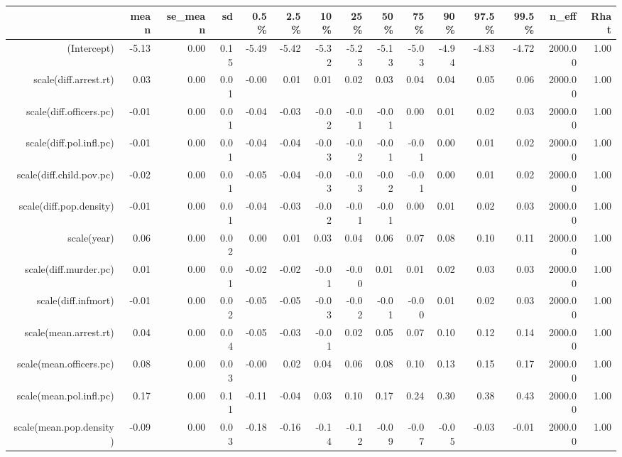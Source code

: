 \begin{table}[ht]
\centering
\begin{tabular}{rrrrrrrrrrrrrrr}
  \hline
 & mean & se\_mean & sd & 0.5\% & 2.5\% & 10\% & 25\% & 50\% & 75\% & 90\% & 97.5\% & 99.5\% & n\_eff & Rhat \\ 
  \hline
(Intercept) & -5.13 & 0.00 & 0.15 & -5.49 & -5.42 & -5.32 & -5.23 & -5.13 & -5.03 & -4.94 & -4.83 & -4.72 & 2000.00 & 1.00 \\ 
  scale(diff.arrest.rt) & 0.03 & 0.00 & 0.01 & -0.00 & 0.01 & 0.01 & 0.02 & 0.03 & 0.04 & 0.04 & 0.05 & 0.06 & 2000.00 & 1.00 \\ 
  scale(diff.officers.pc) & -0.01 & 0.00 & 0.01 & -0.04 & -0.03 & -0.02 & -0.01 & -0.01 & 0.00 & 0.01 & 0.02 & 0.03 & 2000.00 & 1.00 \\ 
  scale(diff.pol.infl.pc) & -0.01 & 0.00 & 0.01 & -0.04 & -0.04 & -0.03 & -0.02 & -0.01 & -0.01 & 0.00 & 0.01 & 0.02 & 2000.00 & 1.00 \\ 
  scale(diff.child.pov.pc) & -0.02 & 0.00 & 0.01 & -0.05 & -0.04 & -0.03 & -0.03 & -0.02 & -0.01 & 0.00 & 0.01 & 0.02 & 2000.00 & 1.00 \\ 
  scale(diff.pop.density) & -0.01 & 0.00 & 0.01 & -0.04 & -0.03 & -0.02 & -0.01 & -0.01 & 0.00 & 0.01 & 0.02 & 0.03 & 2000.00 & 1.00 \\ 
  scale(year) & 0.06 & 0.00 & 0.02 & 0.00 & 0.01 & 0.03 & 0.04 & 0.06 & 0.07 & 0.08 & 0.10 & 0.11 & 2000.00 & 1.00 \\ 
  scale(diff.murder.pc) & 0.01 & 0.00 & 0.01 & -0.02 & -0.02 & -0.01 & -0.00 & 0.01 & 0.01 & 0.02 & 0.03 & 0.03 & 2000.00 & 1.00 \\ 
  scale(diff.infmort) & -0.01 & 0.00 & 0.02 & -0.05 & -0.05 & -0.03 & -0.02 & -0.01 & -0.00 & 0.01 & 0.02 & 0.03 & 2000.00 & 1.00 \\ 
  scale(mean.arrest.rt) & 0.04 & 0.00 & 0.04 & -0.05 & -0.03 & -0.01 & 0.02 & 0.05 & 0.07 & 0.10 & 0.12 & 0.14 & 2000.00 & 1.00 \\ 
  scale(mean.officers.pc) & 0.08 & 0.00 & 0.03 & -0.00 & 0.02 & 0.04 & 0.06 & 0.08 & 0.10 & 0.13 & 0.15 & 0.17 & 2000.00 & 1.00 \\ 
  scale(mean.pol.infl.pc) & 0.17 & 0.00 & 0.11 & -0.11 & -0.04 & 0.03 & 0.10 & 0.17 & 0.24 & 0.30 & 0.38 & 0.43 & 2000.00 & 1.00 \\ 
  scale(mean.pop.density) & -0.09 & 0.00 & 0.03 & -0.18 & -0.16 & -0.14 & -0.12 & -0.09 & -0.07 & -0.05 & -0.03 & -0.01 & 2000.00 & 1.00 \\ 

\end{tabular}
\end{table}
